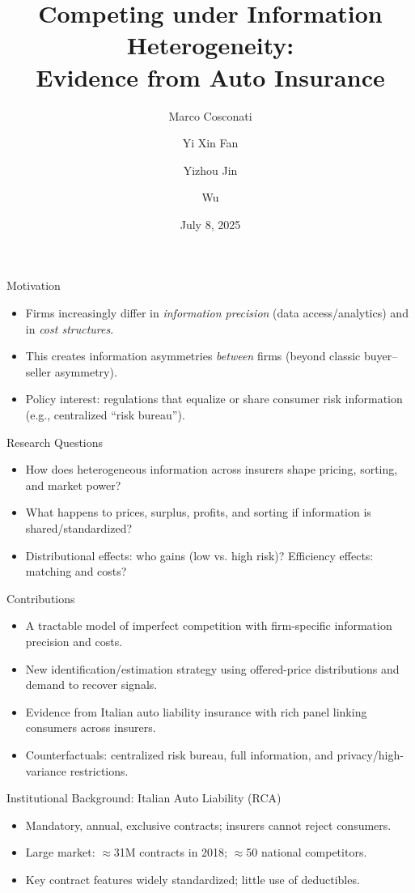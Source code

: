 \documentclass[11pt]{beamer}
\title[Competing under Information Heterogeneity]{Competing under Information Heterogeneity:\\ Evidence from Auto Insurance}
\author[Cosconati, Fan, Jin, Wu]{Marco Cosconati \and Yi Xin Fan \and Yizhou Jin \and Wu}
\institute{IVASS, Bank of Italy \and Caltech \and Caltech \and University of Toronto}
\date{July 8, 2025}
\begin{document}
\begin{frame}
  \titlepage
\end{frame}

\begin{frame}{Motivation}
\justifying
\begin{itemize}
  \item Firms increasingly differ in \emph{information precision} (data access/analytics) and in \emph{cost structures}.
  \item This creates information asymmetries \emph{between} firms (beyond classic buyer--seller asymmetry).
  \item Policy interest: regulations that equalize or share consumer risk information (e.g., centralized ``risk bureau'').
\end{itemize}
\end{frame}

\begin{frame}{Research Questions}
\justifying
\begin{itemize}
  \item How does heterogeneous information across insurers shape pricing, sorting, and market power?
  \item What happens to prices, surplus, profits, and sorting if information is shared/standardized?
  \item Distributional effects: who gains (low vs. high risk)? Efficiency effects: matching and costs?
\end{itemize}
\end{frame}

\begin{frame}{Contributions}
\justifying
\begin{itemize}
  \item A tractable model of imperfect competition with firm-specific information precision and costs.
  \item New identification/estimation strategy using offered-price distributions and demand to recover signals.
  \item Evidence from Italian auto liability insurance with rich panel linking consumers across insurers.
  \item Counterfactuals: centralized risk bureau, full information, and privacy/high-variance restrictions.
\end{itemize}
\end{frame}

\begin{frame}{Institutional Background: Italian Auto Liability (RCA)}
\justifying
\begin{itemize}
  \item Mandatory, annual, exclusive contracts; insurers cannot reject consumers.
  \item Large market: $\approx$31M contracts in 2018; $\approx$50 national competitors.
  \item Key contract features widely standardized; little use of deductibles.
\end{itemize}
\end{frame}
\end{document}
